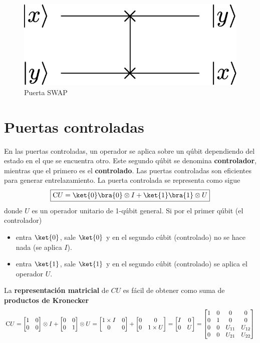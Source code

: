\documentclass[a4paper,11pt]{book} %
\numberwithin{equation}{chapter}
\newcommand{\cg}[1]{{\rm C}#1}
\begin{document}
	\begin{figure}[H]
	\centering 
	\includegraphics[width=0.23\linewidth]{Figuras/Fig_multiqubit_SWAP_gate}
	\caption{Puerta SWAP}
	\label{Fig_multiqubit_SWAP_gate}
	\end{figure}

    \section{Puertas controladas}
    
En las puertas controladas, un operador se aplica sobre un qúbit dependiendo del estado en el que se encuentra otro. Este segundo qúbit se denomina \textbf{controlador}, mientras que el primero es el \textbf{controlado}. Las puertas controladas son eficientes para generar entrelazamiento.
La puerta controlada  se representa como sigue
	\begin{equation}
	\boxed{\cg{U} = \ket{0}\bra{0}\otimes I + \ket{1}\bra{1}\otimes U}
	\end{equation}
donde $U$ es un operador unitario de 1-qúbit general. Si por el primer qúbit (el controlador)
\begin{itemize}
	\item entra $\ket{0}$, sale $\ket{0}$ y en el segundo cúbit (controlado) no se hace nada (se aplica $I$).
	\item entra $\ket{1}$, sale $\ket{1}$ y en el segundo cúbit (controlado) se aplica el operador $U$.
\end{itemize}
La \textbf{representación matricial} de $CU$ es fácil de obtener como suma de  \textbf{productos de Kronecker}
	\begin{equation}
	\cg{U} = \begin{bmatrix}1 & 0 \\ 0 & 0 \end{bmatrix}\otimes  I +  \begin{bmatrix}0 & 0 \\ 0 & 1 \end{bmatrix} \otimes U
= \begin{bmatrix} 1\times I & 0 \\ 0 & 0 \end{bmatrix}  + 
\begin{bmatrix} 0 & 0 \\ 0 & 1\times U \end{bmatrix} = \begin{bmatrix}   I & 0 \\ 0 &   U \end{bmatrix} = 
\begin{bmatrix} 1 & 0 & 0 & 0 \\ 0 & 1 & 0 & 0 \\ 0 & 0 & U_{11} & U_{12} \\
0 & 0 & U_{21} & U_{22}\end{bmatrix}
	\end{equation}
\end{document}
